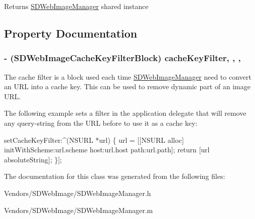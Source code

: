 \begin{DoxyReturn}{Returns}
\hyperlink{interface_s_d_web_image_manager}{S\+D\+Web\+Image\+Manager} shared instance 
\end{DoxyReturn}


\subsection{Property Documentation}
\hypertarget{interface_s_d_web_image_manager_aa95a2fbd9decbe956b7b088075856010}{}
\subsubsection[{cache\+Key\+Filter}]{\setlength{\rightskip}{0pt plus 5cm}-\/ (S\+D\+Web\+Image\+Cache\+Key\+Filter\+Block) cache\+Key\+Filter\hspace{0.3cm}{\ttfamily [read]}, {\ttfamily [write]}, {\ttfamily [nonatomic]}, {\ttfamily [copy]}}\label{interface_s_d_web_image_manager_aa95a2fbd9decbe956b7b088075856010}
The cache filter is a block used each time \hyperlink{interface_s_d_web_image_manager}{S\+D\+Web\+Image\+Manager} need to convert an U\+R\+L into a cache key. This can be used to remove dynamic part of an image U\+R\+L.

The following example sets a filter in the application delegate that will remove any query-\/string from the U\+R\+L before to use it as a cache key\+:


\begin{DoxyCode}
[[\hyperlink{interface_s_d_web_image_manager}{SDWebImageManager} \hyperlink{interface_s_d_web_image_manager_a03e60850e7f6da2aa38b7db870c93626}{sharedManager}] setCacheKeyFilter:^(NSURL *url) \{
    url = [[NSURL alloc] initWithScheme:url.scheme host:url.host path:url.path];
    \textcolor{keywordflow}{return} [url absoluteString];
\}];
\end{DoxyCode}
 

The documentation for this class was generated from the following files\+:\begin{DoxyCompactItemize}
\item 
Vendors/\+S\+D\+Web\+Image/S\+D\+Web\+Image\+Manager.\+h\item 
Vendors/\+S\+D\+Web\+Image/S\+D\+Web\+Image\+Manager.\+m\end{DoxyCompactItemize}

